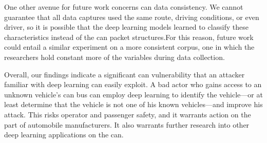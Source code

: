 \documentclass[../main.tex]{subfiles}
\begin{document}
One other avenue for future work concerns \ac{can} data consistency. We cannot guarantee that all data captures used the same route, driving conditions, or even driver, so it is possible that the deep learning models learned to classify these characteristics instead of the \ac{can} packet structures.\footnotemark[3] For this reason, future work could entail a similar experiment on a more consistent corpus, one in which the researchers hold constant more of the variables during data collection.



Overall, our findings indicate a significant \acl{can} vulnerability that an attacker familiar with deep learning can easily exploit. A bad actor who gains access to an unknown vehicle's \ac{can} bus can employ deep learning to identify the vehicle---or at least determine that the vehicle is not one of his known vehicles---and improve his attack. This risks operator and passenger safety, and it warrants action on the part of automobile manufacturers. It also warrants further research into other deep learning applications on the \acl{can}.
\end{document}

